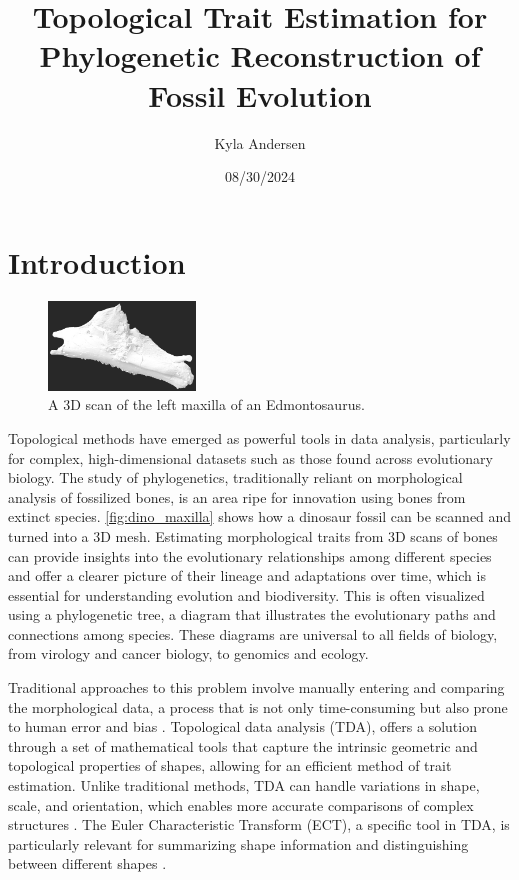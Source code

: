 \documentclass[12pt]{article}
\begin{document}
\title{Topological Trait Estimation for Phylogenetic Reconstruction of Fossil
Evolution}
\author{Kyla Andersen}
\date{08/30/2024}
\maketitle

\doublespacing

\section{Introduction}
\begin{figure}
	\centering
	\vspace{-12pt}
	\includegraphics[width=0.35\textwidth]{newDinoBone.png}
	\caption{A  3D scan of the left maxilla of an Edmontosaurus.\footnotemark}
	\label{fig:dino_maxilla}
\end{figure}
\vspace{-15pt}


Topological methods have emerged as powerful tools in data analysis,
particularly for complex, high-dimensional datasets such as those found across
evolutionary biology. The study of phylogenetics, traditionally reliant on
morphological analysis of fossilized bones, is an area ripe for innovation
using bones from extinct species. \autoref{fig:dino_maxilla} shows how a 
dinosaur fossil can be scanned and turned into a 3D mesh. Estimating 
morphological traits from 3D scans of bones can provide insights into the 
evolutionary relationships among different species and offer a clearer picture 
of their lineage and adaptations over time, which is essential for understanding
evolution and biodiversity. This is often visualized using a phylogenetic tree, 
a diagram that illustrates the evolutionary paths and connections among species.
These diagrams are universal to all fields of biology, from virology and cancer
biology, to genomics and ecology.

Traditional approaches to this problem involve manually entering and comparing the 
morphological data, a process that is not only time-consuming but also prone to
human error and bias \citep{asher2022,bates2009}. Topological data analysis (TDA), 
offers a solution through a set  of mathematical tools that capture the intrinsic 
geometric and topological properties of shapes, allowing for an efficient method 
of trait estimation. Unlike traditional methods, TDA can handle variations in shape, 
scale, and orientation, which enables more accurate comparisons of complex 
structures \citep{zomorodian2009}. The Euler Characteristic Transform (ECT), 
a specific tool in TDA, is particularly relevant for summarizing shape information 
and distinguishing between different shapes \citep{cisewski2023}.
\end{document}
